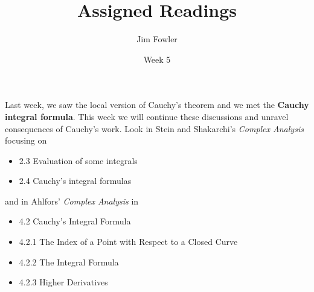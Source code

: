 \documentclass{homework}
\author{Jim Fowler}
\title{Assigned Readings}
\date{Week 5}
\begin{document}
\maketitle

Last week, we saw the local version of Cauchy's theorem and we met the
\textbf{Cauchy integral formula}. This week we will continue these
discussions and unravel consequences of Cauchy's work.  Look in Stein
and Shakarchi's \textit{Complex Analysis} focusing on
\begin{itemize}
\item 2.3 Evaluation of some integrals
\item 2.4 Cauchy's integral formulas
\end{itemize}
and in Ahlfors' \textit{Complex Analysis} in
\begin{itemize}
\item 4.2 Cauchy's Integral Formula
\item 4.2.1 The Index of a Point with Respect to a Closed Curve
\item 4.2.2 The Integral Formula
\item 4.2.3 Higher Derivatives
\end{itemize}
\end{document}
